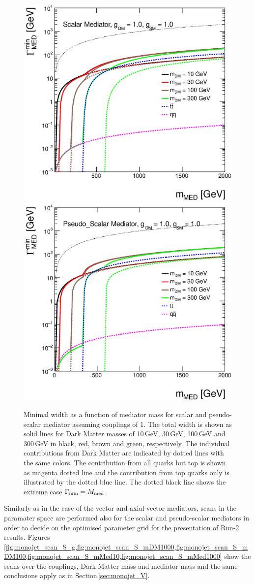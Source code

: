 \begin{figure}
\centering
\includegraphics[width=0.45\linewidth]{figures/monojet/width_S.eps}
\includegraphics[width=0.45\linewidth]{figures/monojet/width_P.eps}
\caption{Minimal width as a function of mediator mass for scalar and pseudo-scalar mediator assuming couplings of 1. The total width is shown as solid lines for Dark Matter masses of 10\,GeV, 30\,GeV, 100\,GeV and 300\,GeV in black, red, brown and green, respectively. The individual contributions from Dark Matter are indicated by dotted lines with the same colors. The contribution from all quarks but top is shown as magenta dotted line and the contribution from top quarks only is illustrated by the dotted blue line. The dotted black line shows the extreme case $\Gamma_{\rm{min}}=M_{\rm{med}}$.}
\label{fig:monojet_width_S}
\end{figure}


Similarly as in the case of the vector and axial-vector mediators, scans in the paramater space are performed also for the scalar and pseudo-scalar mediators in order to decide on the optimised parameter grid for the presentation of Run-2 results. Figures\,\ref{fig:monojet_scan_S_g,fig:monojet_scan_S_mDM1000,fig:monojet_scan_S_mDM100,fig:monojet_scan_S_mMed10,fig:monojet_scan_S_mMed1000} show the scans over the couplings, Dark Matter mass and mediator mass and the same conclusions apply as in Section\,\ref{sec:monojet_V}.

